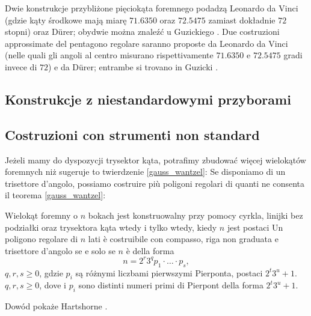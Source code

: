 Dwie konstrukcje przybliżone pięciokąta foremnego podadzą Leonardo da Vinci (gdzie kąty środkowe mają miarę $71.6350$ oraz $72.5475$ zamiast dokładnie $72$ stopni) oraz Dürer; obydwie można znaleźć u Guzickiego \cite[s. 287-290]{guzicki_2021}. %
Due costruzioni approssimate del pentagono regolare saranno proposte da Leonardo da Vinci (nelle quali gli angoli al centro misurano rispettivamente $71.6350$ e $72.5475$ gradi invece di $72$) e da Dürer; entrambe si trovano in Guzicki \cite[p. 287-290]{guzicki_2021}. %

\subsection{Konstrukcje z niestandardowymi przyborami} %
\subsection{Costruzioni con strumenti non standard} %

Jeżeli mamy do dyspozycji trysektor kąta, potrafimy zbudować więcej wielokątów foremnych niż sugeruje to twierdzenie \ref{gauss_wantzel}: %
Se disponiamo di un trisettore d'angolo, possiamo costruire più poligoni regolari di quanti ne consenta il teorema \ref{gauss_wantzel}: %

\begin{proposition}
    Wielokąt foremny o $n$ bokach jest konstruowalny przy pomocy cyrkla, linijki bez podziałki oraz trysektora kąta wtedy i tylko wtedy, kiedy $n$ jest postaci %
    Un poligono regolare di $n$ lati è costruibile con compasso, riga non graduata e trisettore d'angolo se e solo se $n$ è della forma %
    \begin{equation}
        n = 2^r 3^q p_1 \cdot \ldots \cdot p_s,
    \end{equation}
    $q, r, s \ge 0$, gdzie $p_i$ są różnymi liczbami pierwszymi Pierponta, postaci $2^t3^u + 1$. %
    $q, r, s \ge 0$, dove i $p_i$ sono distinti numeri primi di Pierpont della forma $2^t3^u + 1$. %
\end{proposition}

Dowód pokaże Hartshorne \cite[s. 276]{hartshorne_2000}. %

